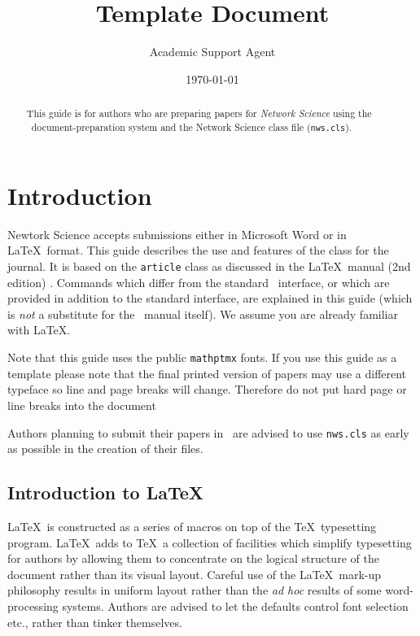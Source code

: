 \documentclass{article}
\title{Template Document}
\author{Academic Support Agent}
\date{\today}
\begin{document}
\maketitle

\label{firstpage}

\maketitle

\begin{abstract}
This guide is for authors who are preparing papers for \emph{Network Science}
 using the \LaTeXe\ document-preparation system
and the Network Science class file (\texttt{nws.cls}).
\end{abstract}



\section{Introduction}

Newtork Science accepts submissions either in Microsoft Word or in \LaTeX\ format.
This guide describes the use and features of the class for the journal. It is
based on the \verb"article"
class as discussed in the \LaTeX\ manual (2nd edition) \cite{LaTeX}.
Commands which differ from the standard \LaTeXe\ interface, or which are
provided in addition to the standard interface, are explained in this
guide (which is \emph{not} a substitute for the \LaTeXe\ manual itself).
We assume you are already familiar with \LaTeX.

Note that this guide uses the public \verb"mathptmx" fonts. If you use this guide
as a template please note that
the final printed version of papers may use a different typeface
so line and page breaks will change. Therefore do not put hard page or line breaks into the document

Authors planning to submit their papers in \LaTeXe\ are advised to use
\verb"nws.cls" as early as possible in the creation of their files.

\subsection{Introduction to \LaTeX}

\LaTeX\ is constructed as a series of macros on top of the \TeX\ typesetting
program. \LaTeX\ adds to \TeX\ a collection of facilities which simplify
typesetting for authors by allowing them to concentrate on the logical
structure of the document rather than its visual layout. Careful use of the
\LaTeX\ mark-up philosophy results in uniform layout rather than the
\emph{ad hoc} results of some word-processing systems. Authors are advised to
let the defaults control font selection etc., rather than tinker themselves.
\end{document}
